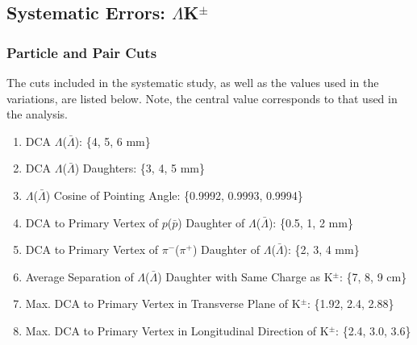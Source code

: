 \documentclass[../AnalysisNoteJBuxton.tex]{subfiles}
\begin{document}
\subsection{Systematic Errors: \texorpdfstring{$\Lambda$K$^{\pm}$}{TEXT}}
\label{SysErrsLamKch}

\subsubsection{Particle and Pair Cuts}
\label{SysErrsLamKch:ParticleAndPairCuts}

The cuts included in the systematic study, as well as the values used in the variations, are listed below.  Note, the central value corresponds to that used in the analysis.

\begin{enumerate}
 \item DCA $\Lambda$($\bar{\Lambda}$): \{4, 5, 6 mm\}
 \item DCA $\Lambda$($\bar{\Lambda}$) Daughters: \{3, 4, 5 mm\}
 \item $\Lambda$($\bar{\Lambda}$) Cosine of Pointing Angle: \{0.9992, 0.9993, 0.9994\}
 \item DCA to Primary Vertex of $p$($\bar{p}$) Daughter of $\Lambda$($\bar{\Lambda}$):  \{0.5, 1, 2 mm\}
 \item DCA to Primary Vertex of $\pi^{-}$($\pi^{+}$) Daughter of $\Lambda$($\bar{\Lambda}$):  \{2, 3, 4 mm\} 
 \item Average Separation of $\Lambda$($\bar{\Lambda}$) Daughter with Same Charge as K$^{\pm}$: \{7, 8, 9 cm\}
 \item Max. DCA to Primary Vertex in Transverse Plane of K$^{\pm}$: \{1.92, 2.4, 2.88\}
 \item Max. DCA to Primary Vertex in Longitudinal Direction of K$^{\pm}$: \{2.4, 3.0, 3.6\} 
\end{enumerate}
\end{document}
